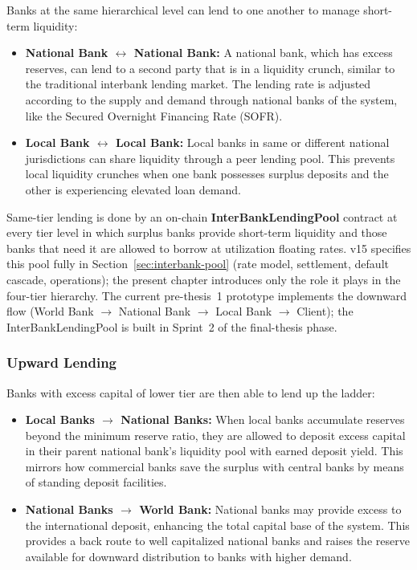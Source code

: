 \documentclass[12pt,a4paper]{report}
\begin{document}
Banks at the same hierarchical level can lend to one another to manage short-term liquidity:

\begin{itemize}[noitemsep]
\item \textbf{National Bank $\leftrightarrow$ National Bank:} A national bank, which has excess reserves, can lend to a second party that is in a liquidity crunch, similar to the traditional interbank lending market. The lending rate is adjusted according to the supply and demand through national banks of the system, like the Secured Overnight Financing Rate (SOFR).
\item \textbf{Local Bank $\leftrightarrow$ Local Bank:} Local banks in same or different national jurisdictions can share liquidity through a peer lending pool. This prevents local liquidity crunches when one bank possesses surplus deposits and the other is experiencing elevated loan demand.
\end{itemize}

Same-tier lending is done by an on-chain \textbf{InterBankLendingPool} contract at every tier level in which surplus banks provide short-term liquidity and those banks that need it are allowed to borrow at utilization floating rates. v15 specifies this pool fully in Section~\ref{sec:interbank-pool} (rate model, settlement, default cascade, operations); the present chapter introduces only the role it plays in the four-tier hierarchy. The current pre-thesis~1 prototype implements the downward flow (World Bank $\to$ National Bank $\to$ Local Bank $\to$ Client); the InterBankLendingPool is built in Sprint~2 of the final-thesis phase.

\subsubsection{Upward Lending}

Banks with excess capital of lower tier are then able to lend up the ladder:

\begin{itemize}[noitemsep]
\item \textbf{Local Banks $\to$ National Banks:} When local banks accumulate reserves beyond the minimum reserve ratio, they are allowed to deposit excess capital in their parent national bank's liquidity pool with earned deposit yield. This mirrors how commercial banks save the surplus with central banks by means of standing deposit facilities.
\item \textbf{National Banks $\to$ World Bank:} National banks may provide excess to the international deposit, enhancing the total capital base of the system. This provides a back route to well capitalized national banks and raises the reserve available for downward distribution to banks with higher demand.
\end{itemize}
\end{document}
